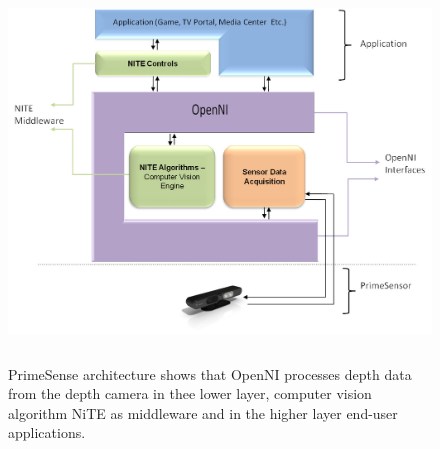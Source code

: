 \begin{figure}
	[h] \centering 
	\includegraphics[height=10cm]{figures/content/ni-arch.jpg} \caption{ PrimeSense architecture shows that OpenNI processes depth data from the depth camera in thee lower layer, computer vision algorithm NiTE as middleware and in the higher layer end-user applications. \cite{12} } \label{fg:ni:arch} 
\end{figure}
